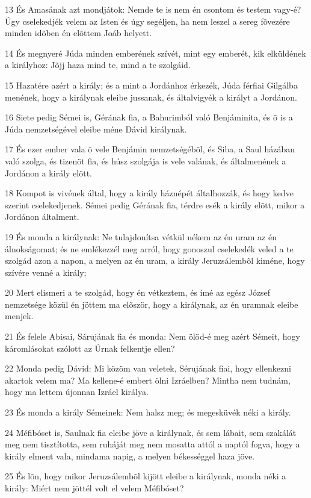 \par 13 És Amasának azt mondjátok: Nemde te is nem én csontom és testem vagy-é? Úgy cselekedjék velem az Isten és úgy segéljen, ha nem leszel a sereg fõvezére minden idõben én elõttem Joáb  helyett.
\par 14 És megnyeré Júda minden emberének szívét, mint egy emberét, kik elküldének a királyhoz: Jõjj haza mind te, mind a te szolgáid.
\par 15 Hazatére azért a király; és a mint a Jordánhoz érkezék, Júda férfiai Gilgálba menének, hogy a királynak eleibe jussanak, és általvigyék a királyt a Jordánon.
\par 16 Siete pedig Sémei is, Gérának fia, a Bahurimból való Benjáminita, és õ is a Júda nemzetségével eleibe méne Dávid királynak.
\par 17 És ezer ember vala õ vele Benjámin nemzetségébõl, és Siba, a Saul házában való szolga, és tizenöt fia, és húsz szolgája is vele valának, és általmenének a Jordánon a király elõtt.
\par 18 Kompot is vivének által, hogy a király háznépét általhozzák, és hogy kedve szerint cselekedjenek. Sémei pedig Gérának fia, térdre esék a király elõtt, mikor a Jordánon általment.
\par 19 És monda a királynak: Ne tulajdonítsa vétkül nékem az én uram az én álnokságomat; és ne emlékezzél meg arról, hogy gonoszul cselekedék veled a te szolgád azon a napon, a melyen az én uram, a király Jeruzsálembõl kiméne, hogy szívére venné a király;
\par 20 Mert elismeri a te szolgád, hogy én vétkeztem, és ímé az egész József nemzetsége közül én jöttem ma elõször, hogy a királynak, az én uramnak eleibe menjek.
\par 21 És felele Abisai, Sárujának fia és monda: Nem ölöd-é meg azért Sémeit, hogy káromlásokat szólott az Úrnak felkentje ellen?
\par 22 Monda pedig Dávid: Mi közöm van veletek, Sérujának fiai, hogy ellenkezni akartok velem ma? Ma kellene-é embert ölni  Izráelben? Mintha nem tudnám, hogy ma lettem újonnan Izráel királya.
\par 23 És monda a király Sémeinek: Nem halsz meg; és megesküvék néki a király.
\par 24 Méfibóset is, Saulnak fia eleibe jöve a királynak, és sem lábait, sem szakálát meg nem tisztította, sem ruháját meg nem mosatta attól a naptól fogva, hogy a király elment vala, mindama napig, a melyen békességgel haza jöve.
\par 25 És lõn, hogy mikor Jeruzsálembõl kijött eleibe a királynak, monda néki a király: Miért nem jöttél volt el velem Méfibóset?

